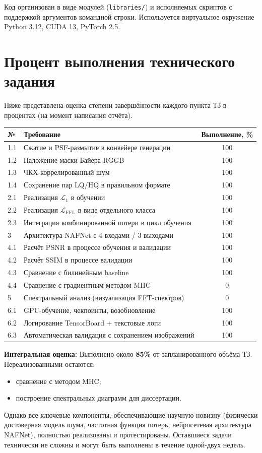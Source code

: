 \documentclass[12pt,a4paper]{article}
\begin{document}
Код организован в виде модулей (\texttt{libraries/}) и исполняемых скриптов с поддержкой аргументов командной строки. Используется виртуальное окружение Python 3.12, CUDA 13, PyTorch 2.5.

\section{Процент выполнения технического задания}
Ниже представлена оценка степени завершённости каждого пункта ТЗ в процентах (на момент написания отчёта).

\begin{tabular}{|l|l|c|}
\hline
\textbf{№} & \textbf{Требование} & \textbf{Выполнение, \%} \\
\hline
1.1 & Сжатие и PSF-размытие в конвейере генерации & 100 \\
1.2 & Наложение маски Байера RGGB & 100 \\
1.3 & ЧКХ-коррелированный шум & 100 \\
1.4 & Сохранение пар LQ/HQ в правильном формате & 100 \\
\hline
2.1 & Реализация $\mathcal{L}_1$ в обучении & 100 \\
2.2 & Реализация $\mathcal{L}_{\text{FFL}}$ в виде отдельного класса & 100 \\
2.3 & Интеграция комбинированной потери в цикл обучения & 100 \\
\hline
3 & Архитектура NAFNet с 4 входами / 3 выходами & 100 \\
\hline
4.1 & Расчёт PSNR в процессе обучения и валидации & 100 \\
4.2 & Расчёт SSIM в процессе валидации & 100 \\
4.3 & Сравнение с билинейным baseline & 100 \\
4.4 & Сравнение с градиентным методом MHC & 0 \\
\hline
5 & Спектральный анализ (визуализация FFT-спектров) & 0 \\
\hline
6.1 & GPU-обучение, чекпоинты, возобновление & 100 \\
6.2 & Логирование TensorBoard + текстовые логи & 100 \\
6.3 & Автоматическая валидация с сохранением изображений & 100 \\
\hline
\end{tabular}

\textbf{Интегральная оценка:}  
Выполнено около \textbf{85\%} от запланированного объёма ТЗ.  
Нереализованными остаются:
\begin{itemize}
    \item сравнение с методом MHC;
    \item построение спектральных диаграмм для диссертации.
\end{itemize}
Однако все ключевые компоненты, обеспечивающие научную новизну (физически достоверная модель шума, частотная функция потерь, нейросетевая архитектура NAFNet), полностью реализованы и протестированы. Оставшиеся задачи технически не сложны и могут быть выполнены в течение одной-двух недель.
\end{document}
